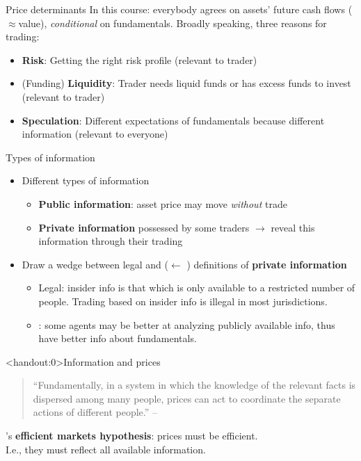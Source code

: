 \documentclass[english,10pt
,aspectratio=169
]{beamer}
\begin{document}
\begin{frame}{Price determinants}
	In this course: everybody agrees on assets' future cash flows ($\approx$value), \textit{conditional} on fundamentals. Broadly speaking, three reasons for trading:
	\begin{itemize}
		\item \textbf{Risk}: Getting the right risk profile (relevant to trader)
		\item (Funding) \textbf{Liquidity}: Trader needs liquid funds or has excess funds to invest (relevant to trader)
		\item \textbf{Speculation}: Different expectations of fundamentals because different \alert{information} (relevant to everyone)
	\end{itemize}
\end{frame}


\begin{frame}{Types of information}
	\begin{itemize}
		\item Different types of information
		\begin{itemize}
			\item \textbf{Public information}:  asset price may move \textit{without} trade
			\item \textbf{Private information} possessed by some traders  $\rightarrow$ reveal this information through their trading
		\end{itemize}
		\pause
		\item Draw a wedge between \alert{legal} and  ($\leftarrow$ ) definitions of \textbf{private information}
		\begin{itemize}
			\item \alert{Legal}: insider info is that which is only available to a restricted number of people. Trading based on insider info is illegal in most jurisdictions.
			\item {}: some agents may be better at analyzing publicly available info, thus have better info about fundamentals.
		\end{itemize}
	\end{itemize}
\end{frame}


\begin{frame}<handout:0>{Information and prices}
	\begin{quotation}
		``Fundamentally, in a system in which the knowledge of the relevant facts is dispersed among many people, prices can act to coordinate the separate actions of different people.'' -- 
	\end{quotation}
	\pause
	
	's \textbf{efficient markets hypothesis}: {prices} must be {efficient}.
	\\
	I.e., they must reflect all available information.
\end{frame}
\end{document}
